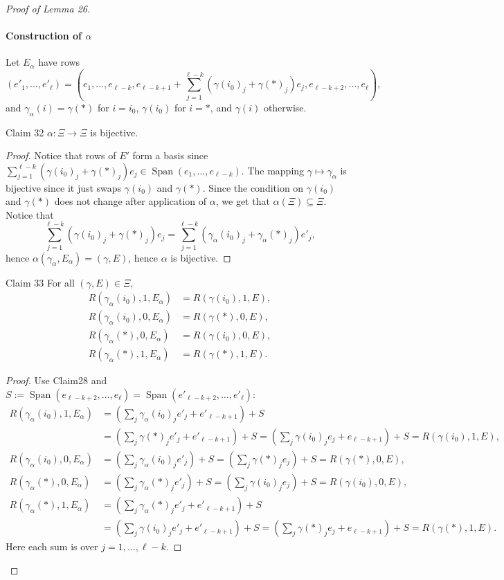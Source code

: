 \begin{proof}[Proof of Lemma 26]
\paragraph{Construction of $\alpha$}
Let $E_\alpha$ have rows
\[
(e'_1,\ldots,e'_\ell)=
(e_1,\ldots,e_{\ell-k},e_{\ell-k+1}+\sum_{j=1}^{\ell-k}(\gamma(i_0)_j+\gamma(*)_j)e_j,e_{\ell-k+2},\ldots,e_\ell),
\]
and $\gamma_\alpha(i)=\gamma(*)$ for $i=i_0$, $\gamma(i_0)$ for $i=*$, and $\gamma(i)$ otherwise.
\begin{authorclaim}{Claim 32}
$\alpha:\Xi\to\Xi$ is bijective.
\end{authorclaim}
\begin{proof}
Notice that rows of $E'$ form a basis since $\sum_{j=1}^{\ell-k}(\gamma(i_0)_j+\gamma(*)_j)e_j\in\operatorname{Span}(e_1,\ldots,e_{\ell-k})$. The mapping $\gamma\mapsto\gamma_\alpha$ is bijective since it just swaps $\gamma(i_0)$ and $\gamma(*)$. Since the condition on $\gamma(i_0)$ and $\gamma(*)$ does not change after application of $\alpha$, we get that $\alpha(\Xi)\subseteq\Xi$. Notice that
\[
\sum_{j=1}^{\ell-k}(\gamma(i_0)_j+\gamma(*)_j)e_j
=\sum_{j=1}^{\ell-k}(\gamma_\alpha(i_0)_j+\gamma_\alpha(*)_j)e'_j,
\]
hence $\alpha(\gamma_\alpha,E_\alpha)=(\gamma,E)$, hence $\alpha$ is bijective.
\end{proof}
\begin{authorclaim}{Claim 33}
For all $(\gamma,E)\in\Xi$,
\begin{align*}
R(\gamma_\alpha(i_0),1,E_\alpha)&=R(\gamma(i_0),1,E),\\
R(\gamma_\alpha(i_0),0,E_\alpha)&=R(\gamma(*),0,E),\\
R(\gamma_\alpha(*),0,E_\alpha)&=R(\gamma(i_0),0,E),\\
R(\gamma_\alpha(*),1,E_\alpha)&=R(\gamma(*),1,E).
\end{align*}
\end{authorclaim}
\begin{proof}
Use Claim28 and $S:=\operatorname{Span}(e_{\ell-k+2},\ldots,e_\ell)=\operatorname{Span}(e'_{\ell-k+2},\ldots,e'_\ell)$:
\begin{align*}
R(\gamma_\alpha(i_0),1,E_\alpha)
&=(\sum_j\gamma_\alpha(i_0)_je'_j+e'_{\ell-k+1})+S\\
&=(\sum_j\gamma(*)_je'_j+e'_{\ell-k+1})+S
=(\sum_j\gamma(i_0)_je_j+e_{\ell-k+1})+S
=R(\gamma(i_0),1,E),\\
R(\gamma_\alpha(i_0),0,E_\alpha)
&=(\sum_j\gamma_\alpha(i_0)_je'_j)+S=(\sum_j\gamma(*)_je_j)+S=R(\gamma(*),0,E),\\
R(\gamma_\alpha(*),0,E_\alpha)
&=(\sum_j\gamma_\alpha(*)_je'_j)+S=(\sum_j\gamma(i_0)_je_j)+S=R(\gamma(i_0),0,E),\\
R(\gamma_\alpha(*),1,E_\alpha)
&=(\sum_j\gamma_\alpha(*)_je'_j+e'_{\ell-k+1})+S\\
&=(\sum_j\gamma(i_0)_je'_j+e'_{\ell-k+1})+S
=(\sum_j\gamma(*)_je_j+e_{\ell-k+1})+S=R(\gamma(*),1,E).
\end{align*}
Here each sum is over $j=1,\ldots,\ell-k$.
\end{proof}

\end{proof}
